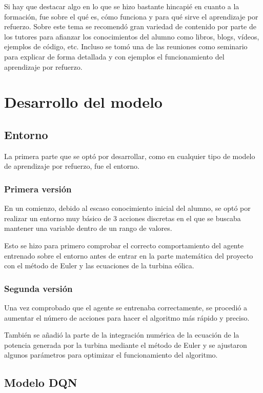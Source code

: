 Si hay que destacar algo en lo que se hizo bastante hincapié en cuanto a la formación, fue sobre el qué es, cómo funciona y para qué sirve el aprendizaje por refuerzo.
Sobre este tema se recomendó gran variedad de contenido por parte de los tutores para afianzar los conocimientos del alumno como libros, blogs, vídeos, ejemplos de código, etc. Incluso se tomó una de las reuniones como seminario para explicar de forma detallada y con ejemplos el funcionamiento del aprendizaje por refuerzo.


\section{Desarrollo del modelo}

\subsection{Entorno}

La primera parte que se optó por desarrollar, como en cualquier tipo de modelo de aprendizaje por refuerzo, fue el entorno.

\subsubsection{Primera versión}

En un comienzo, debido al escaso conocimiento inicial del alumno, se optó por realizar un entorno muy básico de 3 acciones discretas en el que se buscaba mantener una variable dentro de un rango de valores.

Esto se hizo para primero comprobar el correcto comportamiento del agente entrenado sobre el entorno antes de entrar en la parte matemática del proyecto con el método de Euler y las ecuaciones de la turbina eólica.

\subsubsection{Segunda versión}

Una vez comprobado que el agente se entrenaba correctamente, se procedió a aumentar el número de acciones para hacer el algoritmo más rápido y preciso.

También se añadió la parte de la integración numérica de la ecuación de la potencia generada por la turbina mediante el método de Euler y se ajustaron algunos parámetros para optimizar el funcionamiento del algoritmo.

\subsection{Modelo DQN}

